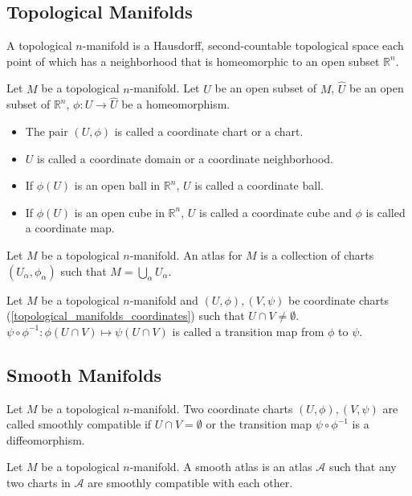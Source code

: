 \subsection{Topological Manifolds}

\begin{defn}
  A topological $n$-manifold is a Hausdorff, second-countable topological space each point of which has a neighborhood that is homeomorphic to an open subset $\mathbb{R}^n$.
\end{defn}

\begin{defn}[Coordinates]\label{topological_manifolds_coordinates}
  Let $M$ be a topological $n$-manifold.
  Let $U$ be an open subset of $M$, $\hat{U}$ be an open subset of $\mathbb{R}^n$, $\phi: U \rightarrow \hat{U}$ be a homeomorphism.
  \begin{itemize}
    \item
      The pair $(U, \phi)$ is called a coordinate chart or a chart.
    \item
      $U$ is called a coordinate domain or a coordinate neighborhood.
    \item
      If $\phi(U)$ is an open ball in $\mathbb{R}^n$, $U$ is called a coordinate ball.
    \item
      If $\phi(U)$ is an open cube in $\mathbb{R}^n$, $U$ is called a coordinate cube and $\phi$ is called a coordinate map.
  \end{itemize}
\end{defn}

\begin{defn}[Atlas]
  Let $M$ be a topological $n$-manifold.
  An atlas for $M$ is a collection of charts $(U_{\alpha}, \phi_{\alpha})$ such that $M = \bigcup_{\alpha} U_{\alpha}$.
\end{defn}

\begin{defn}
  Let $M$ be a topological $n$-manifold and $(U, \phi), (V, \psi)$ be coordinate charts (\ref{topological_manifolds_coordinates}) such that $U \cap V \ne \emptyset$.
  $\psi \circ \phi^{-1}: \phi(U \cap V) \mapsto \psi(U \cap V)$ is called a transition map from $\phi$ to $\psi$.
\end{defn}

\subsection{Smooth Manifolds}

\begin{defn}
  Let $M$ be a topological $n$-manifold.
  Two coordinate charts $(U, \phi), (V, \psi)$ are called smoothly compatible if $U \cap V = \emptyset$ or the transition map $\psi \circ \phi^{-1}$ is a diffeomorphism.
\end{defn}

\begin{defn}
  Let $M$ be a topological $n$-manifold.
  A smooth atlas is an atlas $\mathcal{A}$ such that any two charts in $\mathcal{A}$ are smoothly compatible with each other.
\end{defn}
